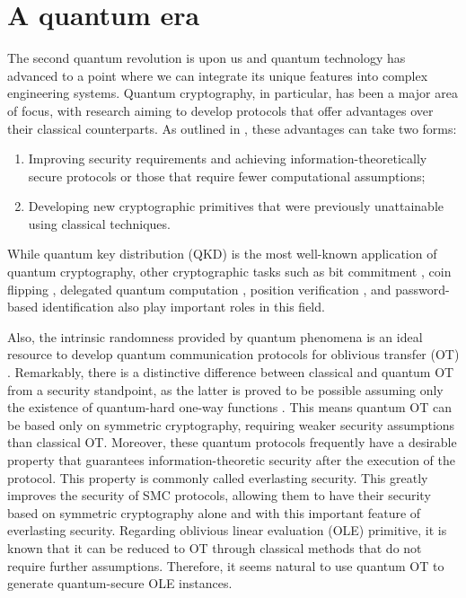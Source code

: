 \section*{A quantum era}

The second quantum revolution is upon us and quantum technology has advanced to a point where we can integrate its unique features into complex engineering systems. Quantum cryptography, in particular, has been a major area of focus, with research aiming to develop protocols that offer advantages over their classical counterparts. As outlined in \cite{B15, PSAN13}, these advantages can take two forms:

\begin{enumerate}
\item Improving security requirements and achieving information-theoretically secure protocols or those that require fewer computational assumptions;
\item Developing new cryptographic primitives that were previously unattainable using classical techniques.
\end{enumerate}
While quantum key distribution (QKD) is the most well-known application of quantum cryptography, other cryptographic tasks such as bit commitment \cite{CK11}, coin flipping \cite{CK09}, delegated quantum computation \cite{BFK09}, position verification \cite{Unr14}, and password-based identification \cite{DFSS14, DFLSS09} also play important roles in this field.

Also, the intrinsic randomness provided by quantum phenomena is an ideal resource to develop quantum communication protocols for oblivious transfer (OT) \cite{BBCS92}. Remarkably, there is a distinctive difference between classical and quantum OT from a security standpoint, as the latter is proved to be possible assuming only the existence of quantum-hard one-way functions \cite{GLSV21, BCKM21}. This means quantum OT can be based only on symmetric cryptography, requiring weaker security assumptions than classical OT. Moreover, these quantum protocols frequently have a desirable property that guarantees information-theoretic security after the execution of the protocol. This property is commonly called everlasting security. This greatly improves the security of SMC protocols, allowing them to have their security based on symmetric cryptography alone and with this important feature of everlasting security. Regarding oblivious linear evaluation (OLE) primitive, it is known that it can be reduced to OT \cite{KOS16} through classical methods that do not require further assumptions. Therefore, it seems natural to use quantum OT to generate quantum-secure OLE instances.



